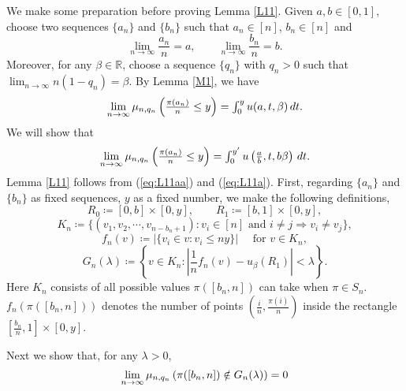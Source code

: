 We make some preparation before proving Lemma \ref{L11}.
Given $a, b \in [0, 1]$, choose two sequences $\{a_n\}$ and $\{b_n\}$ such that $a_n \in [n]$, $b_n \in [n]$ and
\[
\lim_{n \to \infty} \frac{a_n}{n} = a, \qquad \lim_{n \to \infty} \frac{b_n}{n} = b.
\]
Moreover, for any $\beta \in \mathbb{R}$, choose a sequence $\{q_n\}$ with $q_n >0$ such that
$\lim_{n \to \infty} n (1-q_n) = \beta$.
By Lemma \ref{M1}, we have
\begin{equation}
\lim_{n \to \infty} \textstyle\mu_{n, q_n} \left( \frac{\pi(a_n)}{n} \le y \right) = \int_{0}^{y} u(a, t, \beta)\,dt. \label{eq:L11aa}
\end{equation}
We will show that
\begin{equation}
\lim_{n \to \infty} \textstyle\mu_{n, q_n} \left( \frac{\pi(a_n)}{n} \le y \right) = \int_{0}^{y'} u\left(\frac{a}{b}, t, b \beta\right)\,dt. \label{eq:L11a}
\end{equation}
Lemma \ref{L11} follows from (\ref{eq:L11aa}) and (\ref{eq:L11a}). First, regarding $\{a_n\}$ and $\{b_n\}$ as fixed sequences, $y$ as a fixed number, we make the following definitions,
\[
R_0 \coloneqq [0, b] \times [0, y], \qquad R_1 \coloneqq [b, 1] \times [0, y],
\]
\[
K_n  \coloneqq \{ ( v_1, v_2, \cdots, v_{n - b_n +1} ): v_i \in [n] \text{ and } i \neq j \Rightarrow v_i \neq v_j \},
\]
\[
f_n(v) \coloneqq |\{ v_i \in v : v_i \le n y \} | \quad \text{ for } v \in K_n,
\]
\[
G_n(\lambda) \coloneqq \left\{ v \in K_n: \left| \frac{1}{n}f_n(v) - u_{\beta}(R_1) \right| < \lambda \right\}.
\]
Here $K_n$ consists of all possible values $\pi([b_n, n])$ can take when $\pi \in S_n$.  $f_n(\pi([b_n, n]))$ denotes the number of
points $\left( \frac{i}{n}, \frac{\pi(i)}{n} \right)$ inside the rectangle $[\frac{b_n}{n}, 1] \times [0, y]$.

Next we show that, for any $\lambda > 0 $,
\begin{equation}
\lim_{n \to \infty} \mu_{n, q_n} \left( \pi([b_n, n]) \notin G_n(\lambda) \right) = 0 \label{eq:L11b}
\end{equation}


